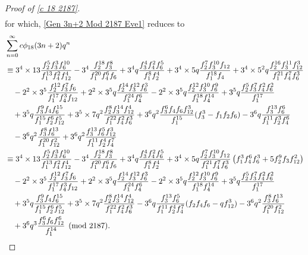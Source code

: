 \documentclass[12pt]{article}
\numberwithin{equation}{section}
\theoremstyle{plain}
\numberwithin{theorem}{section}
\theoremstyle{definition}
\theoremstyle{remark}
\begin{document}
\begin{proof}[Proof of \eqref{c 18 2187}]
\begin{align*}
    \end{align*}
    for which, \eqref{Gen 3n+2 Mod 2187 Eve1} reduces to
    \begin{align}
        &\sum_{n=0}^\infty c\phi_{18}(3n+2)q^n\notag\\
        &\equiv 3^4\times 13\frac{f_2^5 f_3^3 f_6^{10}}{f_1^{13} f_4^2 f_{12}^4}-3^4 \frac{f_2^{18} f_3^8}{f_1^{20} f_4^6 f_6}+3^4 q \frac{f_3^4 f_4^2 f_6^5}{f_1^8 f_2^4}+3^4\times 5 q \frac{f_2^7 f_3^{10} f_{12}}{f_1^{18} f_4}+3^4\times  5^2 q \frac{f_2^{16} f_3^{11} f_{12}^3}{f_1^{21} f_4^7 f_6^3}\notag\\
        &\quad -2^2\times 3^5\frac{f_2^{12} f_3^7 f_6}{f_1^{17} f_4^3 f_{12}}+2^2\times 3^5 q\frac{f_2^{14} f_3^{12} f_6^3}{f_1^{24} f_4^6}-2^2\times 3^5 q\frac{f_2^{12} f_3^{10} f_6^9}{f_1^{18} f_4^{14}}+3^5 q\frac{f_2^5 f_3^7 f_4^2 f_6^2}{f_1^{17}}\notag\\
        &\quad +3^5 q\frac{f_3^9 f_4 f_6^{15}}{f_1^{15} f_2^6 f_{12}^5}+3^5\times 7 q^2\frac{f_2^8 f_3^{14} f_{12}^4}{f_1^{22} f_4^2 f_6^3}+3^6 q^2\frac{f_3^6 f_4 f_6 f_{12}^3}{f_1^{15}}(f_3^3-f_1 f_2 f_6)-3^6 q\frac{f_3^{13} f_6^6}{f_1^{11} f_2^3 f_4^6}\notag\\
        &\quad -3^6 q^2\frac{f_3^8 f_6^{13}}{f_1^{20} f_{12}^2}+3^6 q^2\frac{f_3^{13} f_6^5 f_{12}^3}{f_1^{11} f_2^4 f_4^7}\notag\\
        &\equiv 3^4\times 13\frac{f_2^5 f_3^3 f_6^{10}}{f_1^{13} f_4^2 f_{12}^4}-3^4 \frac{f_2^{18} f_3^8}{f_1^{20} f_4^6 f_6}+3^4 q \frac{f_3^4 f_4^2 f_6^5}{f_1^8 f_2^4}+ 3^4\times 5 q \frac{f_2^7 f_3^{10} f_{12}}{f_1^{21} f_4^7 f_6^3}\left(f_1^3 f_4^6 f_6^3+5f_2^9 f_3 f_{12}^2\right)\notag\\
        &\quad -2^2\times 3^5\frac{f_2^{12} f_3^7 f_6}{f_1^{17} f_4^3 f_{12}}+2^2\times 3^5 q\frac{f_2^{14} f_3^{12} f_6^3}{f_1^{24} f_4^6}-2^2\times 3^5 q\frac{f_2^{12} f_3^{10} f_6^9}{f_1^{18} f_4^{14}}+3^5 q\frac{f_2^5 f_3^7 f_4^2 f_6^2}{f_1^{17}}\notag\\
        &\quad +3^5 q\frac{f_3^9 f_4 f_6^{15}}{f_1^{15} f_2^6 f_{12}^5}+3^5\times 7 q^2\frac{f_2^8 f_3^{14} f_{12}^4}{f_1^{22} f_4^2 f_6^3}-3^6 q\frac{f_3^{13} f_6^5}{f_1^{11} f_2^4 f_4^7}(f_2 f_4 f_6-q f_{12}^3)-3^6 q^2\frac{f_3^8 f_6^{13}}{f_1^{20} f_{12}^2}\notag\\
        &\quad +3^6 q^3 \frac{f_3^6 f_6 f_{12}^6}{f_1^{14}} \pmod{2187}. \label{Gen 3n+2 Mod 2187 Eve2}
    \end{align}


\end{proof}
\end{document}

